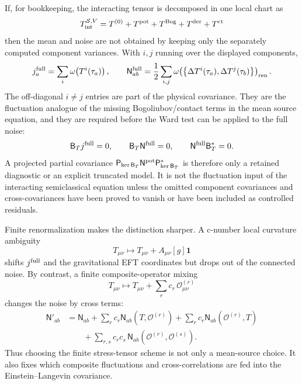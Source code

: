 \begin{controlledapproximation}
If, for bookkeeping, the interacting tensor is decomposed in one local chart as
\[
  T_{\rm int}^{\mathcal S,V}
  =
  T^{(0)}
  +T^{\rm pot}
  +T^{\rm Bog}
  +T^{\rm der}
  +T^{\rm ct}
\]
then the mean and noise are not obtained by keeping only the separately
computed component variances.  With \(i,j\) running over the displayed
components,
\begin{equation}
  j_a^{\rm full}
  =
  \sum_i
  \omega\!\left(T^i(\tau_a)\right),
  \qquad
  \mathsf N_{ab}^{\rm full}
  =
  \frac12
  \sum_{i,j}
  \omega\!\left(
    \left\{
      \Delta T^i(\tau_a),
      \Delta T^j(\tau_b)
    \right\}
  \right)_{\rm ren}.
  \label{eq:semiclassical-full-noise-component-sum}
\end{equation}
The off-diagonal \(i\ne j\) entries are part of the physical covariance.  They
are the fluctuation analogue of the missing Bogoliubov/contact terms in the
mean source equation, and they are required before the Ward test can be applied
to the full noise:
\begin{equation}
  \mathsf B_T j^{\rm full}=0,
  \qquad
  \mathsf B_T\mathsf N^{\rm full}=0,
  \qquad
  \mathsf N^{\rm full}\mathsf B_T^*=0 .
  \label{eq:semiclassical-full-package-ward-conditions}
\end{equation}
A projected partial covariance
\(\mathsf P_{\ker\mathsf B_T}\mathsf N^{\rm pot}\mathsf P_{\ker\mathsf B_T}^*\)
is therefore only a retained diagnostic or an explicit truncated model.  It is
not the fluctuation input of the interacting semiclassical equation unless the
omitted component covariances and cross-covariances have been proved to vanish
or have been included as controlled residuals.

Finite renormalization makes the distinction sharper.  A c-number local
curvature ambiguity
\[
  T_{\mu\nu}\mapsto T_{\mu\nu}+A_{\mu\nu}[g]\mathbf 1
\]
shifts \(j^{\rm full}\) and the gravitational EFT coordinates but drops out of
the connected noise.  By contrast, a finite composite-operator mixing
\[
  T_{\mu\nu}\mapsto
  T_{\mu\nu}+\sum_r c_r\,\mathcal O^{(r)}_{\mu\nu}
\]
changes the noise by cross terms:
\begin{equation}
\begin{aligned}
  \mathsf N'_{ab}
  &=
  \mathsf N_{ab}
  +
  \sum_r c_r
  \mathsf N_{ab}(T,\mathcal O^{(r)})
  +
  \sum_r c_r
  \mathsf N_{ab}(\mathcal O^{(r)},T) \\
  &\qquad
  +
  \sum_{r,s}c_rc_s\,
  \mathsf N_{ab}(\mathcal O^{(r)},\mathcal O^{(s)}).
\end{aligned}
  \label{eq:semiclassical-noise-finite-renormalization}
\end{equation}
Thus choosing the finite stress-tensor scheme is not only a mean-source
choice.  It also fixes which composite fluctuations and cross-correlations are
fed into the Einstein--Langevin covariance.


\end{controlledapproximation}
